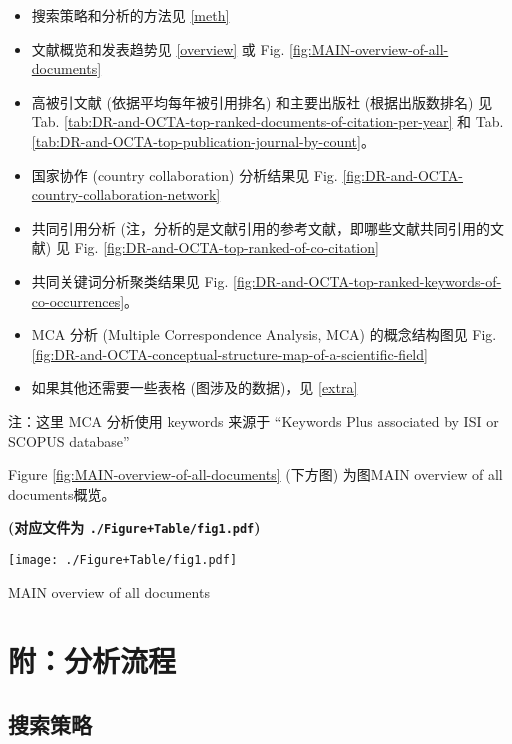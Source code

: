 \documentclass[
]{article}
\providecommand{\tightlist}{%
  \setlength{\itemsep}{0pt}\setlength{\parskip}{0pt}}
\begin{document}
\begin{itemize}
\tightlist
\item
  搜索策略和分析的方法见 \ref{meth}
\item
  文献概览和发表趋势见 \ref{overview} 或 Fig. \ref{fig:MAIN-overview-of-all-documents}
\item
  高被引文献 (依据平均每年被引用排名) 和主要出版社 (根据出版数排名) 见
  Tab. \ref{tab:DR-and-OCTA-top-ranked-documents-of-citation-per-year} 和
  Tab. \ref{tab:DR-and-OCTA-top-publication-journal-by-count}。
\item
  国家协作 (country collaboration) 分析结果见 Fig. \ref{fig:DR-and-OCTA-country-collaboration-network}
\item
  共同引用分析 (注，分析的是文献引用的参考文献，即哪些文献共同引用的文献) 见
  Fig. \ref{fig:DR-and-OCTA-top-ranked-of-co-citation}
\item
  共同关键词分析聚类结果见 Fig. \ref{fig:DR-and-OCTA-top-ranked-keywords-of-co-occurrences}。
\item
  MCA 分析 (Multiple Correspondence Analysis, MCA) 的概念结构图见
  Fig. \ref{fig:DR-and-OCTA-conceptual-structure-map-of-a-scientific-field}
\item
  如果其他还需要一些表格 (图涉及的数据)，见 \ref{extra}
\end{itemize}

注：这里 MCA 分析使用 keywords 来源于 ``Keywords Plus associated by ISI or SCOPUS database''

Figure \ref{fig:MAIN-overview-of-all-documents} (下方图) 为图MAIN overview of all documents概览。

\textbf{(对应文件为 \texttt{./Figure+Table/fig1.pdf})}

\def\@captype{figure}
\begin{center}
\texttt{[image: ./Figure+Table/fig1.pdf]}
\caption{MAIN overview of all documents}\label{fig:MAIN-overview-of-all-documents}
\end{center}

\hypertarget{workflow}{%
\section{附：分析流程}\label{workflow}}

\hypertarget{stra}{%
\subsection{搜索策略}\label{stra}}
\end{document}
